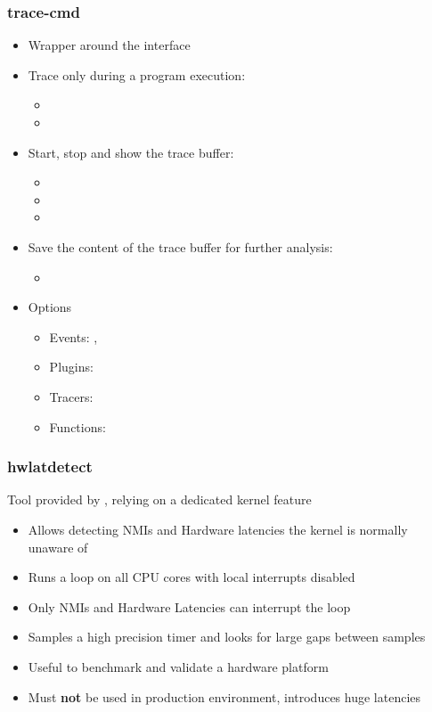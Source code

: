 \begin{frame}
	\frametitle{trace-cmd}
	\begin{itemize}
		\item Wrapper around the  interface
		\item Trace only during a program execution:
			\begin{itemize}
				\item {}
				\item {}
			\end{itemize}
		\item Start, stop and show the trace buffer:
			\begin{itemize}
				\item {}
				\item {}
				\item {}
			\end{itemize}
		\item Save the content of the trace buffer for further analysis:
			\begin{itemize}
				\item {}
			\end{itemize}
		\item Options
			\begin{itemize}
				\item Events: , 
				\item Plugins: 
				\item Tracers: 
				\item Functions: 
			\end{itemize}
	\end{itemize}
\end{frame}

\begin{frame}
	\frametitle{hwlatdetect}
	Tool provided by , relying on a dedicated kernel feature
	\begin{itemize}
		\item Allows detecting NMIs and Hardware latencies the kernel is normally unaware of
		\item Runs a loop on all CPU cores with local interrupts disabled
		\item Only NMIs and Hardware Latencies can interrupt the loop
		\item Samples a high precision timer and looks for large gaps between samples
		\item Useful to benchmark and validate a hardware platform
		\item Must \textbf{not} be used in production environment, introduces huge latencies
	\end{itemize}
\end{frame}

